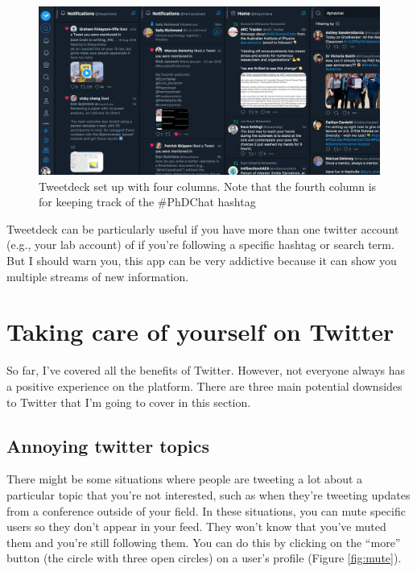 \documentclass[]{book}
\begin{document}
\begin{figure}

\includegraphics[width=0.8\linewidth]{images/tweetdeck} \hfill{}

\caption{Tweetdeck set up with four columns. Note that the fourth column is for keeping track of the #PhDChat hashtag}\label{fig:unnamed-chunk-6}
\end{figure}

Tweetdeck can be particularly useful if you have more than one twitter account (e.g., your lab account) of if you're following a specific hashtag or search term. But I should warn you, this app can be very addictive because it can show you multiple streams of new information.

\hypertarget{care}{%
\chapter{Taking care of yourself on Twitter}\label{care}}

So far, I've covered all the benefits of Twitter. However, not everyone always has a positive experience on the platform. There are three main potential downsides to Twitter that I'm going to cover in this section.

\hypertarget{annoying-twitter-topics}{%
\section{Annoying twitter topics}\label{annoying-twitter-topics}}

There might be some situations where people are tweeting a lot about a particular topic that you're not interested, such as when they're tweeting updates from a conference outside of your field. In these situations, you can mute specific users so they don't appear in your feed. They won't know that you've muted them and you're still following them. You can do this by clicking on the ``more'' button (the circle with three open circles) on a user's profile (Figure \ref{fig:mute}).
\end{document}
